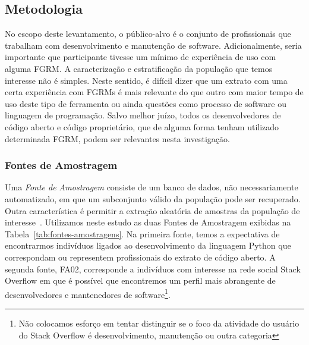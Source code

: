 \subsection{Metodologia}
\label{subsec:pesq_metodologias}

No escopo deste levantamento, o público-alvo é o conjunto de profissionais que
trabalham com desenvolvimento e manutenção de software. Adicionalmente, seria
importante que participante tivesse um mínimo de experiência de uso com alguma
FGRM\@. A caracterização e estratificação da população que temos interesse não é
simples. Neste sentido, é difícil dizer que um extrato com uma certa experiência
com FGRMs é mais relevante do que outro com maior tempo de uso deste tipo de
ferramenta ou ainda questões como processo de software ou linguagem de
programação. Salvo melhor juízo, todos os desenvolvedores de código aberto e
código proprietário, que de alguma forma tenham utilizado determinada FGRM,
podem ser relevantes nesta investigação.

\subsubsection{Fontes de Amostragem}
\label{subsubsec:fontes_amostragem}

Uma \textit{Fonte de Amostragem} consiste de um banco de dados, não
necessariamente automatizado, em que um subconjunto válido da população pode ser
recuperado. Outra característica é permitir a extração aleatória de amostras da
população de interesse~\cite{de2014towards}. Utilizamos neste estudo as duas
Fontes de Amostragem exibidas na Tabela~\ref{tab:fontes-amostragens}. Na
primeira fonte, temos a expectativa de encontrarmos indivíduos ligados ao
desenvolvimento da linguagem Python que correspondam ou representem
profissionais do extrato de código aberto. A segunda fonte, FA02, corresponde a
indivíduos com interesse na rede social Stack Overflow em que é possível que
encontremos um perfil mais abrangente de desenvolvedores e mantenedores de
software\footnote{Não colocamos esforço em tentar distinguir se o foco da
    atividade do usuário do Stack Overflow é desenvolvimento, manutenção ou
    outra categoria}.

\begin{table}[htpb]
\centering
{}
\caption{Fontes de Amostragem utilizadas no estudo}
\label{tab:fontes-amostragens}
\end{table}

